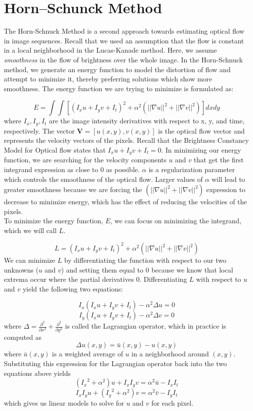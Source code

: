 \documentclass{article}
\newcommand*{\pd}[3][]{\ensuremath{\frac{\partial^{#1} #2}{\partial #3}}}
\begin{document}
\section{Horn–Schunck Method}
The Horn-Schnuck Method is a second approach towards estimating optical flow in image sequences. Recall that we used an assumption that the flow is constant in a local neighborhood in the Lucas-Kanade method. Here, we assume \textit{smoothness} in the flow of brightness over the whole image. In the Horn-Schnuck method, we generate an energy function to model the distortion of flow and attempt to minimize it, thereby preferring solutions which show more smoothness. The energy function we are trying to minimize is formulated as:

$$E = \int \int \left[\left(I_xu + I_yv + I_t\right)^2  + \alpha^2 \left( \lvert \lvert \nabla u \rvert \rvert^2  + \lvert \lvert \nabla v \rvert \rvert^2\right) \right]dxdy$$
\noindent
where $I_x, I_y, I_t$ are the image intensity derivatives with respect to  x, y, and time, respectively. The vector $\mathbf{V} = \left[ u(x,y), v(x,y) \right]$ is the optical flow vector and represents the velocity vectors of the pixels. Recall that the Brightness Constancy Model for Optical flow states that $ I_xu + I_yv + I_t  = 0$. In minimizing our energy function, we are searching for the velocity components $u$ and $v$ that get the first integrand expression as close to 0 as possible. $\alpha$ is a regularization parameter which controls the smoothness of the optical flow. Larger values of $\alpha$ will lead to greater smoothness because we are forcing the $\left( \lvert \lvert \nabla u \rvert \rvert^2  + \lvert \lvert \nabla v \rvert \rvert^2\right)$ expression to decrease to minimize energy, which has the effect of reducing the velocities of the pixels.\\
\noindent
To minimize the energy function, $E$, we can focus on minimizing the integrand, which we will call $L$.

$$L = \left(I_xu + I_yv + I_t\right)^2  + \alpha^2 \left( \lvert \lvert \nabla u \rvert \rvert^2  + \lvert \lvert \nabla v \rvert \rvert^2\right)$$
\noindent
We can minimize $L$ by differentiating the function with respect to our two unknowns ($u$ and $v$) and setting them equal to 0 because we know that local extrema occur where the partial derivatives 0. Differentiating $L$ with respect to $u$ and $v$ yield the following two equations: 

$$I_x \left( I_xu + I_yv + I_t \right) - \alpha^2\Delta u = 0 $$
$$I_y \left( I_xu + I_yv + I_t \right) - \alpha^2\Delta v = 0 $$
\noindent
where $\Delta = \pd[2]{}{x^2} + \pd[2]{}{y^2}$ is called the Lagrangian operator, which in practice is computed as 
$$\Delta u(x,y) = \bar{u}(x,y) - u(x,y)$$
\noindent
where $\bar{u}(x,y)$ is a weighted average of $u$ in a neighborhood around $(x,y)$. Substituting this expression for the Lagrangian operator back into the two equations above yields
$$ \left( {I_x}^2 + \alpha^2 \right) u + I_xI_yv = \alpha^2\bar{u} - I_xI_t $$
$$ I_xI_yu + \left( {I_y}^2 + \alpha^2 \right)v = \alpha^2 \bar{v} -I_yI_t $$
\noindent
which gives us linear models to solve for $u$ and $v$ for each pixel.
\end{document}
